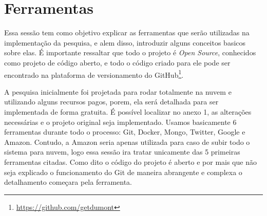 \section{Ferramentas}
Essa sessão tem como objetivo explicar as ferramentas que serão utilizadas na implementação da pesquisa, e alem disso, introduzir alguns conceitos basicos sobre elas. É importante ressaltar que todo o projeto é \textit{Open Source}, conhecidos como projeto de código aberto, e todo o código criado para ele pode ser encontrado na plataforma de versionamento do GitHub\footnote{\url{https://github.com/getdumont}}.

A pesquisa inicialmente foi projetada para rodar totalmente na nuvem e utilizando alguns recursos pagos, porem, ela será detalhada para ser implementada de forma gratuita. É possível localizar no anexo 1, as alterações necessárias e o projeto original seja implementado. Usamos basicamente 6 ferramentas durante todo o processo: Git, Docker, Mongo, Twitter, Google e Amazon. Contudo, a Amazon seria apenas utilizada para caso de subir todo o sistema para nuvem, logo essa sessão ira tratar unicamente das 5 primeiras ferramentas citadas. Como dito o código do projeto é aberto e por mais que não seja explicado o funcionamento do Git de maneira abrangente e complexa o detalhamento começara pela ferramenta.





